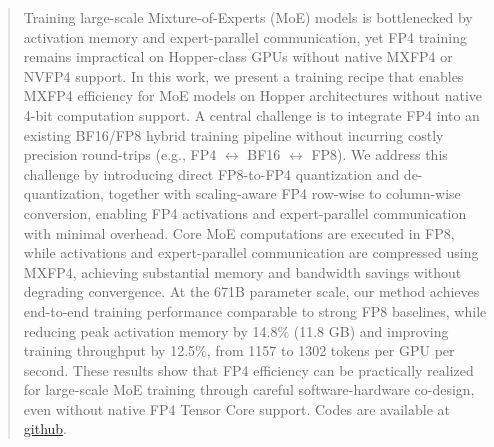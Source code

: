 \documentclass{article}
\theoremstyle{plain}
\theoremstyle{definition}
\theoremstyle{remark}
\begin{document}
\printAffiliationsAndNotice{}  %

\begin{abstract}
Training large-scale Mixture-of-Experts (MoE) models is bottlenecked by activation memory and expert-parallel communication, yet FP4 training remains impractical on Hopper-class GPUs without native MXFP4 or NVFP4 support. In this work, we present a training recipe that enables MXFP4 efficiency for MoE models on Hopper architectures without native 4-bit computation support. A central challenge is to integrate FP4 into an existing BF16/FP8 hybrid training pipeline without incurring costly precision round-trips (e.g., FP4 $\leftrightarrow$ BF16 $\leftrightarrow$ FP8). We address this challenge by introducing direct FP8-to-FP4 quantization and de-quantization, together with scaling-aware FP4 row-wise to column-wise conversion, enabling FP4 activations and expert-parallel communication with minimal overhead. Core MoE computations are executed in FP8, while activations and expert-parallel communication are compressed using MXFP4, achieving substantial memory and bandwidth savings without degrading convergence. At the 671B parameter scale, our method achieves end-to-end training performance comparable to strong FP8 baselines, while reducing peak activation memory by 14.8\% (11.8 GB) and improving training throughput by 12.5\%, from 1157 to 1302 tokens per GPU per second. These results show that FP4 efficiency can be practically realized for large-scale MoE training through careful software-hardware co-design, even without native FP4 Tensor Core support. 
Codes are available at \href{https://github.com/anonymous-git-2026/MXFP4-Hopper}{github}.
\end{abstract}







\end{document}
